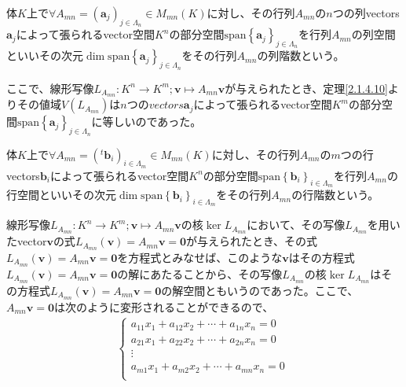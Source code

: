 \documentclass[dvipdfmx]{jsarticle}
\begin{document}
\begin{dfn}
体$K$上で$\forall A_{mn} = \left( \mathbf{a}_{j} \right)_{j \in \varLambda_{n}} \in M_{mn}(K)$に対し、その行列$A_{mn}$の$n$つの列vectors$\mathbf{a}_{j}$によって張られるvector空間$K^{n}$の部分空間${\mathrm{span} }\left\{ \mathbf{a}_{j} \right\}_{j \in \varLambda_{n}}$を行列$A_{mn}$の列空間といいその次元$\dim{{\mathrm{span} }\left\{ \mathbf{a}_{j} \right\}_{j \in \varLambda_{n}}}$をその行列$A_{mn}$の列階数という。
\end{dfn}\par
ここで、線形写像$L_{A_{mn}}:K^{n} \rightarrow K^{m};\mathbf{v} \mapsto A_{mn}\mathbf{v}$が与えられたとき、定理\ref{2.1.4.10}よりその値域$V\left( L_{A_{mn}} \right)$は$n$つの$vectors\mathbf{a}_{j}$によって張られるvector空間$K^{m}$の部分空間${\mathrm{span} }\left\{ \mathbf{a}_{j} \right\}_{j \in \varLambda_{n}}$に等しいのであった。
\begin{dfn}
体$K$上で$\forall A_{mn} = \left(^{t}\mathbf{b}_{i} \right)_{i \in \varLambda_{m}} \in M_{mn}(K)$に対し、その行列$A_{mn}$の$m$つの行vectors$\mathbf{b}_{i}$によって張られるvector空間$K^{n}$の部分空間${\mathrm{span} }\left\{ \mathbf{b}_{i} \right\}_{i \in \varLambda_{m}}$を行列$A_{mn}$の行空間といいその次元$\dim{{\mathrm{span} }\left\{ \mathbf{b}_{i} \right\}_{i \in \varLambda_{m}}}$をその行列$A_{mn}$の行階数という。
\end{dfn}\par
線形写像$L_{A_{mn}}:K^{n} \rightarrow K^{m};\mathbf{v} \mapsto A_{mn}\mathbf{v}$の核$\ker L_{A_{mn}}$において、その写像$L_{A_{mn}}$を用いたvector$\mathbf{v}$の式$L_{A_{mn}}\left( \mathbf{v} \right) = A_{mn}\mathbf{v} = \mathbf{0}$が与えられたとき、その式$L_{A_{mn}}\left( \mathbf{v} \right) = A_{mn}\mathbf{v} = \mathbf{0}$を方程式とみなせば、このような$\mathbf{v}$はその方程式$L_{A_{mn}}\left( \mathbf{v} \right) = A_{mn}\mathbf{v} = \mathbf{0}$の解にあたることから、その写像$L_{A_{mn}}$の核$\ker L_{A_{mn}}$はその方程式$L_{A_{mn}}\left( \mathbf{v} \right) = A_{mn}\mathbf{v} = \mathbf{0}$の解空間ともいうのであった。ここで、$A_{mn}\mathbf{v} = \mathbf{0}$は次のように変形されることができるので、
\begin{align*}
\left\{ \begin{matrix}
a_{11}x_{1} + a_{12}x_{2} + \cdots + a_{1n}x_{n} = 0 \\
a_{21}x_{1} + a_{22}x_{2} + \cdots + a_{2n}x_{n} = 0 \\
 \vdots \\
a_{m1}x_{1} + a_{m2}x_{2} + \cdots + a_{mn}x_{n} = 0 \\
\end{matrix} \right.\ 
\end{align*}
\end{document}
